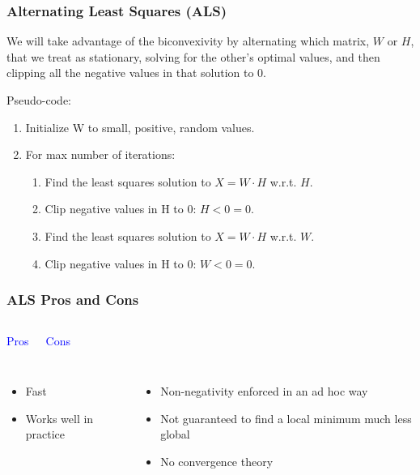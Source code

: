 \documentclass{beamer}
\begin{document}
\begin{frame}
  \frametitle{Alternating Least Squares (ALS)}
  We will take advantage of the biconvexivity by alternating which matrix, $W$ or $H$, that we treat as stationary, solving for the other's optimal values, and then clipping all the negative values in that solution to 0. \vspace{4mm} \pause

  Pseudo-code:
  \begin{enumerate}
    \item Initialize W to small, positive, random values.
    \item For max number of iterations:
      \begin{enumerate}
        \item Find the least squares solution to $ X = W \cdot H $ w.r.t. $H$.
        \item Clip negative values in H to 0: $ H < 0 = 0$.
        \item Find the least squares solution to $ X = W \cdot H $ w.r.t. $W$.
        \item Clip negative values in H to 0: $ W < 0 = 0$.
      \end{enumerate}
  \end{enumerate}
\end{frame}

\begin{frame}
  \frametitle{ALS Pros and Cons}
  \begin{columns}
    \begin{center} {\LARGE \textcolor{blue}{Pros}} \end{center}
    \begin{center} {\LARGE \textcolor{blue}{Cons}} \end{center}
  \end{columns} \vspace{4mm}
  \begin{columns}
    \begin{itemize}
      \item Fast
      \item Works well in practice
    \end{itemize}
    \begin{itemize}
      \item Non-negativity enforced in an ad hoc way
      \item Not guaranteed to find a local minimum much less global
      \item No convergence theory
    \end{itemize}
  \end{columns}
\end{frame}
\end{document}
